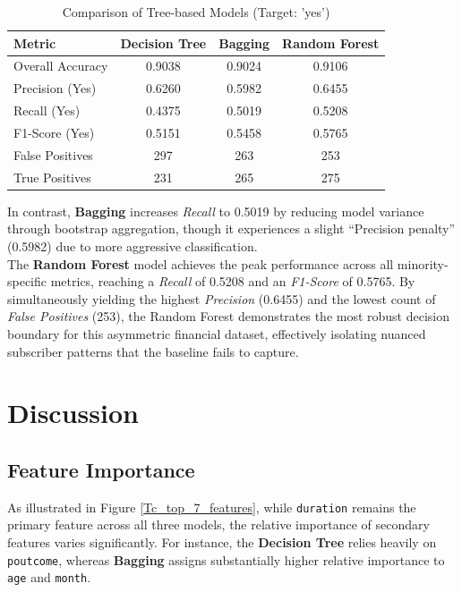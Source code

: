 \documentclass[conference]{IEEEtran}
\begin{document}
 \begin{table}[ht]
 	\centering
 	\caption{Comparison of Tree-based Models (Target: 'yes')}
 	\label{tab:model_comparison}
 	\begin{tabular}{lccc}
 		\hline \hline
 		\textbf{Metric} & \textbf{Decision Tree} & \textbf{Bagging} & \textbf{Random Forest} \\
 		\hline
 		Overall Accuracy & 0.9038 & 0.9024 & 0.9106 \\
 		Precision (Yes)  & 0.6260 & 0.5982 & 0.6455 \\
 		Recall (Yes)     & 0.4375 & 0.5019 & 0.5208 \\
 		F1-Score (Yes)   & 0.5151 & 0.5458 & 0.5765 \\
 		\hline
 		False Positives  & 297    & 263    & 253    \\
 		True Positives   & 231    & 265    & 275    \\
 		\hline \hline
 	\end{tabular}
 \end{table}
 
 In contrast, \textbf{Bagging} increases \textit{Recall} to 0.5019 by reducing model variance through bootstrap aggregation, though it experiences a slight ``Precision penalty'' (0.5982) due to more aggressive classification.\\
 \indent The \textbf{Random Forest} model achieves the peak performance across all minority-specific metrics, reaching a \textit{Recall} of 0.5208 and an \textit{F1-Score} of 0.5765. By simultaneously yielding the highest \textit{Precision} (0.6455) and the lowest count of \textit{False Positives} (253), the Random Forest demonstrates the most robust decision boundary for this asymmetric financial dataset, effectively isolating nuanced subscriber patterns that the baseline fails to capture.

\section{\textbf{Discussion}}

\subsection{Feature Importance}

As illustrated in Figure \ref{Tc_top_7_features}, while \texttt{duration} remains the primary feature across all three models, the relative importance of secondary features varies significantly. For instance, the \textbf{Decision Tree} relies heavily on \texttt{poutcome}, whereas \textbf{Bagging} assigns substantially higher relative importance to \texttt{age} and \texttt{month}.
\end{document}

